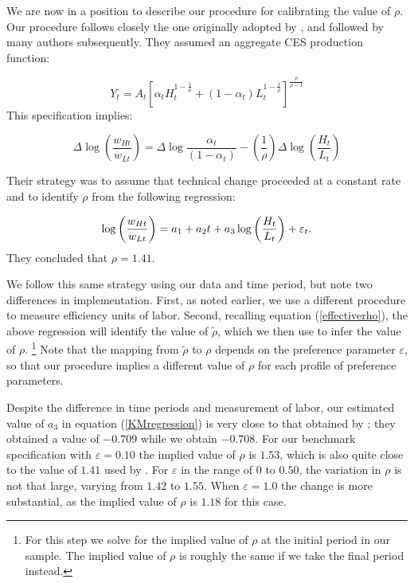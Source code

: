 \documentclass[12pt,english]{article}
\begin{document}
{\normalsize We are now in a position to describe our procedure for
calibrating the value of $\rho $. Our procedure follows closely the one
originally adopted by \citet{KatMur92}, and followed by many authors
subsequently. They assumed an aggregate CES production function: }

{\normalsize 
\begin{equation*}
Y_{t}=A_{t}[\alpha _{t}H_{t}^{1-\frac{1}{\rho }}+(1-\alpha _{t})L_{t}^{1-%
\frac{1}{\rho }}]^{\frac{\rho }{\rho -1}}
\end{equation*}%
This specification implies: }

{\normalsize 
\begin{equation*}
\Delta \log \left(\frac{w_{Ht}}{w_{Lt}}\right)=\Delta \log \frac{\alpha _{t}%
}{(1-\alpha _{t})}-\left(\frac{1}{\rho }\right)\Delta \log \left(\frac{H_{t}%
}{L_{t}}\right)
\end{equation*}
}

{\normalsize Their strategy was to assume that technical change proceeded at
a constant rate and to identify $\rho $ from the following regression: }

{\normalsize 
\begin{equation}
\log \left(\frac{w_{Ht}}{w_{Lt}}\right)=a_{1}+a_{2}t+a_{3}\log \left(\frac{%
H_{t}}{L_{t}}\right)+\varepsilon _{t}\text{.}  \label{KMregression}
\end{equation}%
They concluded that $\rho =1.41$. }

{\normalsize We follow this same strategy using our data and time period,
but note two differences in implementation. First, as noted earlier, we use
a different procedure to measure efficiency units of labor. Second,
recalling equation (\ref{effectiverho}), the above regression will identify
the value of $\tilde{\rho}$, which we then use to infer the value of $\rho $.%
\footnote{%
For this step we solve for the implied value of $\rho$ at the initial period
in our sample. The implied value of $\rho$ is roughly the same if we take
the final period instead.} Note that the mapping from $\tilde{\rho}$ to $%
\rho $ depends on the preference parameter $\varepsilon $, so that our
procedure implies a different value of $\rho $ for each profile of
preference parameters. }

{\normalsize Despite the difference in time periods and measurement of
labor, our estimated value of $a_{3}$ in equation (\ref{KMregression}) is
very close to that obtained by \citet{KatMur92}; they obtained a value of $%
-0.709$ while we obtain $-0.708$. For our benchmark specification with $%
\varepsilon =0.10$ the implied value of $\rho $ is $1.53$, which is also
quite close to the value of $1.41$ used by \citet{KatMur92}. For $%
\varepsilon $ in the range of $0$ to $0.50$, the variation in $\rho $ is not
that large, varying from $1.42 $ to $1.55$. When $\varepsilon =1.0$ the
change is more substantial, as the implied value of $\rho $ is $1.18$ for
this case. }
\end{document}
